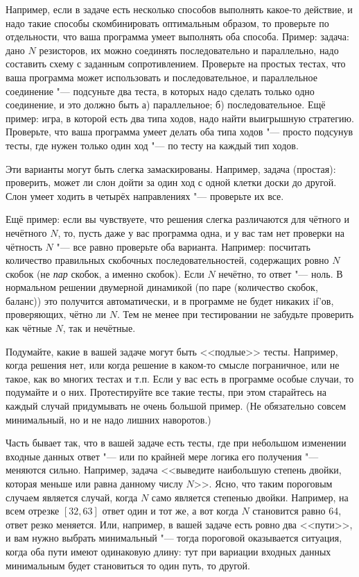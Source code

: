 \documentclass[a4paper,10pt]{problems}
\begin{document}
Например, если в задаче есть несколько способов выполнять какое-то действие, и надо такие способы скомбинировать оптимальным образом,
то проверьте по отдельности, что ваша программа умеет выполнять оба способа. 
Пример: задача: дано $N$ резисторов, их можно соединять последовательно и параллельно, надо составить схему с заданным сопротивлением.
Проверьте на простых тестах, что ваша программа может использовать и последовательное, и параллельное соединение "---
подсуньте два теста, в которых надо сделать только одно соединение, и это должно быть а) параллельное; б) последовательное.
Ещё пример: игра, в которой есть два типа ходов, надо найти выигрышную стратегию. Проверьте, что ваша программа умеет делать оба типа ходов
"--- просто подсунув тесты, где нужен только один ход "--- по тесту на каждый тип ходов.

Эти варианты могут быть слегка замаскированы. 
Например, задача (простая): проверить, может ли слон дойти за один ход с одной клетки доски до другой.
Слон умеет ходить в четырёх направлениях "--- проверьте их все.

Ещё пример: если вы чувствуете, что решения слегка различаются для чётного и нечётного $N$, то, пусть даже у вас программа одна,
и у вас там нет проверки на чётность $N$ "--- все равно проверьте оба варианта. 
Например: посчитать количество правильных скобочных последовательностей, содержащих ровно $N$ скобок (не \textit{пар} скобок, а именно скобок).
Если $N$ нечётно, то ответ "--- ноль. 
В нормальном решении двумерной динамикой (по паре (количество скобок, баланс)) это получится автоматически, и в программе не будет никаких if'ов,
проверяющих, чётно ли $N$. Тем не менее при тестировании не забудьте проверить как чётные $N$, так и нечётные.

Подумайте, какие в вашей задаче могут быть <<подлые>> тесты. 
Например, когда решения нет, или когда решение в каком-то смысле пограничное, или не такое, как во многих тестах и т.п.
Если у вас есть в программе особые случаи, то подумайте и о них. 
Протестируйте все такие тесты, при этом старайтесь на каждый случай придумывать не очень большой пример. 
(Не обязательно совсем минимальный, но и не надо лишних наворотов.)

Часть бывает так, что в вашей задаче есть тесты, где при небольшом изменении входные данных ответ "--- или по крайней мере логика его получения "--- меняются сильно.
Например, задача <<выведите наибольшую степень двойки, которая меньше или равна данному числу $N$>>. 
Ясно, что таким пороговым случаем является случай, когда $N$ само является степенью двойки. 
Например, на всем отрезке $[32,63]$ ответ один и тот же, а вот когда $N$ становится равно 64, ответ резко меняется.
Или, например, в вашей задаче есть ровно два <<пути>>, и вам нужно выбрать минимальный "--- тогда пороговой оказывается ситуация,
когда оба пути имеют одинаковую длину: тут при вариации входных данных минимальным будет становиться то один путь, то другой.
\end{document}
